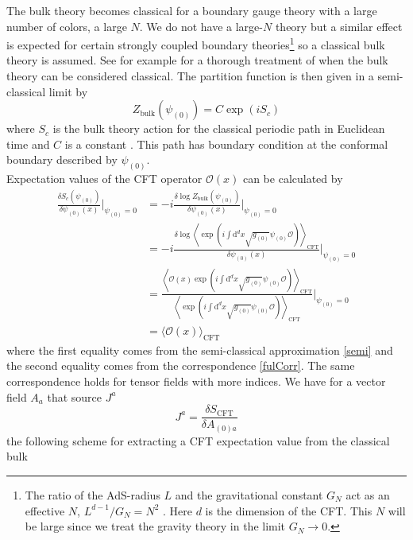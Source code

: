 \documentclass[12pt]{report}
\renewcommand{\d}{\ensuremath{\mathrm{d}}}
\renewcommand{\i}{\ensuremath{i}}
\begin{document}
The bulk theory becomes classical for a boundary gauge theory with a large number of colors, a large $N$. We do not have a large-$N$ theory but a similar effect is expected for certain strongly coupled boundary theories\footnote{The ratio of the AdS-radius $L$ and the gravitational constant $G_N$ act as an effective $N$, $L^{d-1}/G_N=N^2$ \cite{McGreevy:2009xe}. Here $d$ is the dimension of the CFT. This $N$ will be large since we treat the gravity theory in the limit $G_N\rightarrow 0$.} so a classical bulk theory is assumed. See for example \cite{McGreevy:2009xe} for a thorough treatment of when the bulk theory can be considered classical. The partition function is then given in a semi-classical limit by
\begin{equation}
 Z_{\mathrm{bulk}}(\psi_{(0)})=C\exp(\i S_c)\label{semi}
\end{equation}
where $S_c$ is the bulk theory action for the classical periodic path in Euclidean time and $C$ is a constant \cite{hartnoll8}. This path has boundary condition at the conformal boundary described by $\psi_{(0)}$.\\
Expectation values of the CFT operator $\mathcal{O}(x)$ can be calculated by
\begin{equation}
\begin{split}
\frac{\delta S_c(\psi_{(0)})}{\delta\psi_{(0)}(x)}|_{\psi_{(0)}=0}&=
-\i\frac{\delta\log Z_{\mathrm{bulk}}(\psi_{(0)})}{\delta\psi_{(0)}(x)}|_{\psi_{(0)}=0}\\
&=-\i\frac{\delta\log\left\langle\exp(\i\int\d^dx\sqrt{g_{(0)}}\psi_{(0)}\mathcal{O})\right\rangle_{\mathrm{CFT}}}{\delta\psi_{(0)}(x)}|_{\psi_{(0)}=0}\\
&=\frac{\left\langle\mathcal{O}(x)\exp(\i\int\d^dx\sqrt{g_{(0)}}\psi_{(0)}\mathcal{O})\right\rangle_{\mathrm{CFT}}}{\left\langle\exp(\i\int\d^dx\sqrt{g_{(0)}}\psi_{(0)}\mathcal{O})\right\rangle_{\mathrm{CFT}}}|_{\psi_{(0)}=0}\\
&=\langle \mathcal{O}(x) \rangle_{\mathrm{CFT}}
\end{split}
\end{equation}
where the first equality comes from the semi-classical approximation \eqref{semi} and the second equality comes from the correspondence \eqref{fulCorr}. The same correspondence holds for tensor fields with more indices. We have for a vector field $A_a$ that source $J^a$
\begin{equation}
J^a= \frac{\delta S_{\mathrm{CFT}}}{\delta A_{(0)a}}
\end{equation}
the following scheme for extracting a CFT expectation value from the classical bulk
\end{document}
